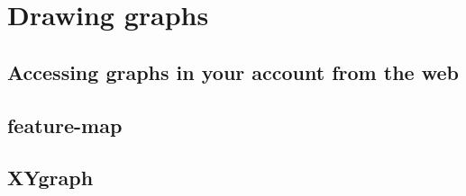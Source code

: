 
\section{Drawing graphs}

\subsection{Accessing graphs in your account from the web}

\subsection{feature-map}

\subsection{XYgraph}

